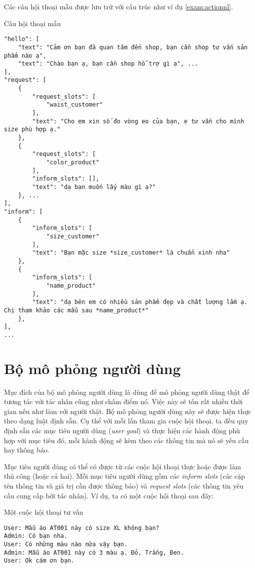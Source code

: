 Các câu hội thoại mẫu được lưu trữ với cấu trúc như ví dụ \ref{exam:actionnl}.

\renewcommand{\textboxenvname}{Ví dụ}
\begin{textbox}{Câu hội thoại mẫu}
\begin{Verbatim}[breaklines=true, breakanywhere=true]
"hello": [
    "text": "Cảm ơn bạn đã quan tâm đến shop, bạn cần shop tư vấn sản phẩm nào ạ",
    "text": "Chào bạn ạ, bạn cần shop hỗ trợ gì ạ", ...
],
"request": [
    {
        "request_slots": [
            "waist_customer"
        ],
        "text": "Cho em xin số đo vòng eo của bạn, e tư vấn cho mình size phù hợp ạ."
    },
    {
        "request_slots": [
            "color_product"
        ],
        "inform_slots": [],
        "text": "dạ bạn muốn lấy màu gì ạ?"
    }, ...
],
"inform": [
    {
        "inform_slots": [
            "size_customer"
        ],
        "text": "Bạn mặc size *size_customer* là chuẩn xinh nha"
    },
    {
        "inform_slots": [
            "name_product"
        ],
        "text": "dạ bên em có nhiều sản phẩm đẹp và chất lượng lắm ạ. Chị tham khảo các mẫu sau *name_product*"
    },
],
...
\end{Verbatim}
\end{textbox}

\section{Bộ mô phỏng người dùng}
\label{sec:usersim}
Mục đích của bộ mô phỏng người dùng là dùng để mô phỏng người dùng
thật để tương tác với tác nhân cũng như chấm điểm nó. Việc này sẽ tốn
rất nhiều thời gian nếu như làm với người thật. Bộ mô phỏng người dùng
này sẽ được hiện thực theo dạng luật định sẵn. Cụ thể với mỗi lần
tham gia cuộc hội thoại, ta đều quy định sẵn các mục tiêu người dùng
(\textit{user goal}) và thực hiện các hành động phù hợp với mục tiêu
đó, mỗi hành động sẽ kèm theo các thông tin mà nó sẽ yêu cầu hay
thông báo.

Mục tiêu người dùng có thể có được từ các cuộc hội thoại thực hoặc
được làm thủ công (hoặc cả hai). Mỗi mục tiêu người dùng gồm các
\textit{inform slots} (các cặp tên thông tin và giá trị cần được
thông báo) và \textit{request slots} (các thông tin yêu cầu cung cấp
bởi tác nhân). Ví dụ, ta có một cuộc hội thoại sau đây:

\renewcommand{\textboxenvname}{Ví dụ}
\begin{textbox}{Một cuộc hội thoại tư vấn}
\begin{Verbatim}[breaklines=true, breakanywhere=true]
User: Mẫu áo AT001 này có size XL không bạn?
Admin: Có bạn nha.
User: Có những màu nào nữa vậy bạn.
Admin: Mẫu áo AT001 này có 3 màu ạ. Đỏ, Trắng, Đen.
User: Ok cám ơn bạn.
\end{Verbatim}
\end{textbox}

